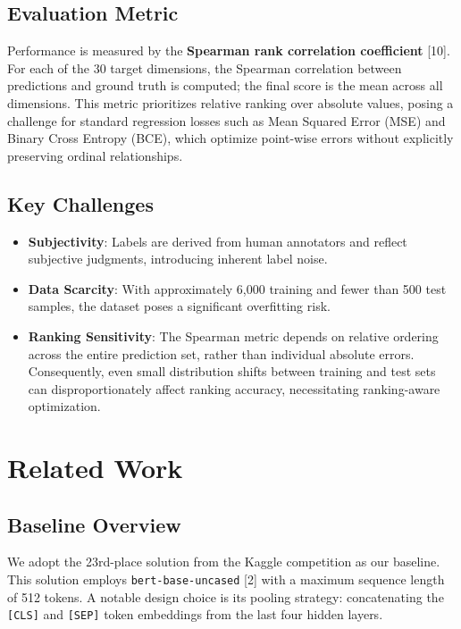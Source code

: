 \documentclass{article}
\begin{document}
\subsection{Evaluation Metric}
Performance is measured by the \textbf{Spearman rank correlation coefficient} [10]. For each of the 30 target dimensions, the Spearman correlation between predictions and ground truth is computed; the final score is the mean across all dimensions. This metric prioritizes relative ranking over absolute values, posing a challenge for standard regression losses such as Mean Squared Error (MSE) and Binary Cross Entropy (BCE), which optimize point-wise errors without explicitly preserving ordinal relationships.

\subsection{Key Challenges}
\begin{itemize}
    \item \textbf{Subjectivity}: Labels are derived from human annotators and reflect subjective judgments, introducing inherent label noise.
    \item \textbf{Data Scarcity}: With approximately 6,000 training and fewer than 500 test samples, the dataset poses a significant overfitting risk.
    \item \textbf{Ranking Sensitivity}: The Spearman metric depends on relative ordering across the entire prediction set, rather than individual absolute errors. Consequently, even small distribution shifts between training and test sets can disproportionately affect ranking accuracy, necessitating ranking-aware optimization.
\end{itemize}




\section{Related Work}

\subsection{Baseline Overview}
We adopt the 23rd-place solution from the Kaggle competition as our baseline. This solution employs \texttt{bert-base-uncased} [2] with a maximum sequence length of 512 tokens. A notable design choice is its pooling strategy: concatenating the \texttt{[CLS]} and \texttt{[SEP]} token embeddings from the last four hidden layers.
\end{document}
